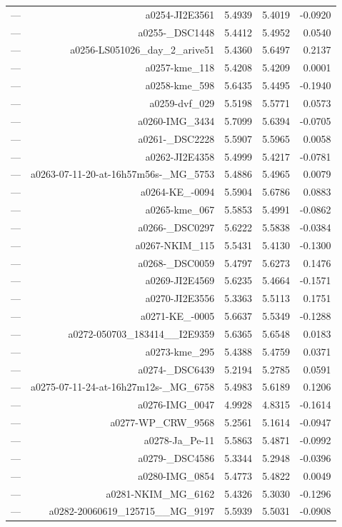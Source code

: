 \begin{table}[htbp]
\begin{tabular}{lrrrr}
— & a0254-JI2E3561 & 5.4939 & 5.4019 & -0.0920 \\
— & a0255-_DSC1448 & 5.4412 & 5.4952 & 0.0540 \\
— & a0256-LS051026_day_2_arive51 & 5.4360 & 5.6497 & 0.2137 \\
— & a0257-kme_118 & 5.4208 & 5.4209 & 0.0001 \\
— & a0258-kme_598 & 5.6435 & 5.4495 & -0.1940 \\
— & a0259-dvf_029 & 5.5198 & 5.5771 & 0.0573 \\
— & a0260-IMG_3434 & 5.7099 & 5.6394 & -0.0705 \\
— & a0261-_DSC2228 & 5.5907 & 5.5965 & 0.0058 \\
— & a0262-JI2E4358 & 5.4999 & 5.4217 & -0.0781 \\
— & a0263-07-11-20-at-16h57m56s-_MG_5753 & 5.4886 & 5.4965 & 0.0079 \\
— & a0264-KE_-0094 & 5.5904 & 5.6786 & 0.0883 \\
— & a0265-kme_067 & 5.5853 & 5.4991 & -0.0862 \\
— & a0266-_DSC0297 & 5.6222 & 5.5838 & -0.0384 \\
— & a0267-NKIM_115 & 5.5431 & 5.4130 & -0.1300 \\
— & a0268-_DSC0059 & 5.4797 & 5.6273 & 0.1476 \\
— & a0269-JI2E4569 & 5.6235 & 5.4664 & -0.1571 \\
— & a0270-JI2E3556 & 5.3363 & 5.5113 & 0.1751 \\
— & a0271-KE_-0005 & 5.6637 & 5.5349 & -0.1288 \\
— & a0272-050703_183414__I2E9359 & 5.6365 & 5.6548 & 0.0183 \\
— & a0273-kme_295 & 5.4388 & 5.4759 & 0.0371 \\
— & a0274-_DSC6439 & 5.2194 & 5.2785 & 0.0591 \\
— & a0275-07-11-24-at-16h27m12s-_MG_6758 & 5.4983 & 5.6189 & 0.1206 \\
— & a0276-IMG_0047 & 4.9928 & 4.8315 & -0.1614 \\
— & a0277-WP_CRW_9568 & 5.2561 & 5.1614 & -0.0947 \\
— & a0278-Ja_Pe-11 & 5.5863 & 5.4871 & -0.0992 \\
— & a0279-_DSC4586 & 5.3344 & 5.2948 & -0.0396 \\
— & a0280-IMG_0854 & 5.4773 & 5.4822 & 0.0049 \\
— & a0281-NKIM_MG_6162 & 5.4326 & 5.3030 & -0.1296 \\
— & a0282-20060619_125715__MG_9197 & 5.5939 & 5.5031 & -0.0908 \\

\end{tabular}
\end{table}
